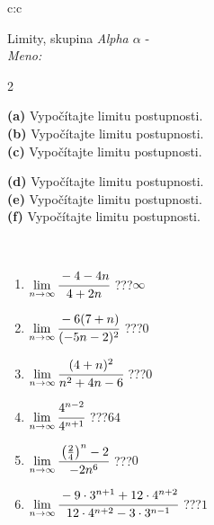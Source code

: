 \documentclass[10pt]{report}
\begin{document}
\thispagestyle{empty}
\begin{tabular}{c:c}
\begin{minipage}[c][104.5mm][t]{0.5\linewidth}
\begin{center}
\vspace{5mm}
{\huge Limity, skupina \textit{Alpha $\alpha$} -}\\[5mm]
\textit{Meno:}\phantom{xxxxxxxxxxxxxxxxxxxxxxxxxxxxxxxxxxxxxxxxxxxxxxxxxxxxxxxxxxxxxxxxx}\\[5mm]
\begin{minipage}{0.95\linewidth}
\begin{center}
{\small \begin{multicols}{2} \raggedright
\textbf{(a)} Vypočítajte limitu postupnosti. \\[1mm]
\textbf{(b)} Vypočítajte limitu postupnosti. \\[1mm]
\textbf{(c)} Vypočítajte limitu postupnosti. \par \columnbreak
\textbf{(d)} Vypočítajte limitu postupnosti. \\[1mm]
\textbf{(e)} Vypočítajte limitu postupnosti. \\[1mm]
\textbf{(f)} Vypočítajte limitu postupnosti.
\end{multicols}
}
\end{center}
\end{minipage}
\\[1mm]
\begin{minipage}{0.79\linewidth}
\begin{center}
\begin{varwidth}{\linewidth}
\setlength{\itemsep}{0pt}
\begin{enumerate}
\footnotesizerr
\item $\lim\limits_{n\to\infty}\cfrac{-4-4n}{4+2n}$\quad \dotfill\; ???\;\dotfill \quad $\infty$
\item $\lim\limits_{n\to\infty}\cfrac{-6(7+n)}{(-5n-2)^2}$\quad \dotfill\; ???\;\dotfill \quad $0$
\item $\lim\limits_{n\to\infty}\cfrac{(4+n)^2}{n^2+4n-6}$\quad \dotfill\; ???\;\dotfill \quad $0$
\item $\lim\limits_{n\to\infty}\cfrac{4^{n-2}}{4^{n+1}}$\quad \dotfill\; ???\;\dotfill \quad $64$
\item $\lim\limits_{n\to\infty}\cfrac{\left(\frac{2}{4}\right)^n -2}{-2n^{6}}$\quad \dotfill\; ???\;\dotfill \quad $0$
\item $\lim\limits_{n\to\infty}\cfrac{-9\cdot 3^{n+1}+12\cdot 4^{n+2}}{12\cdot 4^{n+2}-3\cdot 3^{n-1}}$\quad \dotfill\; ???\;\dotfill \quad $1$

\end{enumerate}
\end{varwidth}
\end{center}
\end{minipage}
\end{center}
\end{minipage}
\end{tabular}
\end{document}

